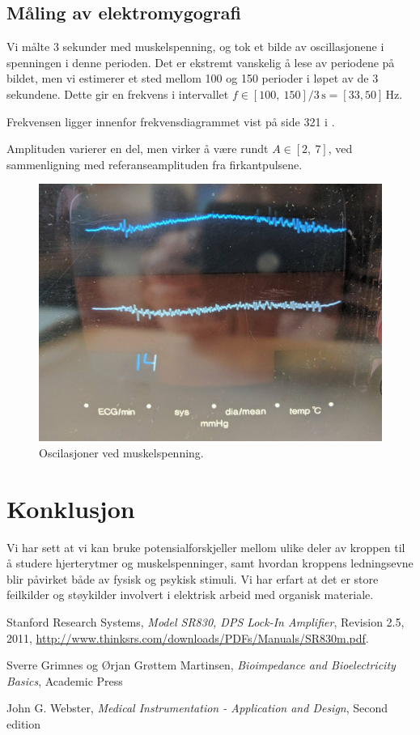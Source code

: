 \documentclass[11pt,norsk]{article}
\begin{document}
\subsection{Måling av elektromygografi}
Vi målte 3 sekunder med muskelspenning, og tok et bilde av oscillasjonene i spenningen i denne perioden. Det er ekstremt vanskelig å lese av periodene på bildet, men vi estimerer et sted mellom 100 og 150 perioder i løpet av de 3 sekundene. Dette gir en frekvens i intervallet $f \in [100,\ 150] / 3\,\mathrm{s} = [33, 50]\,\mathrm{Hz}$.

Frekvensen ligger innenfor frekvensdiagrammet vist på side 321 i \cite{MedIns}.

Amplituden varierer en del, men virker å være rundt $A \in [2,\ 7]$, ved sammenligning med referanseamplituden fra firkantpulsene.


\begin{figure}[H]
\includegraphics[width = \textwidth]{fig/picture4.jpg}
\caption{Oscilasjoner ved muskelspenning.}
\label{fig:picture4}
\end{figure}

\section{Konklusjon}
Vi har sett at vi kan bruke potensialforskjeller mellom ulike deler av kroppen til å studere hjerterytmer og muskelspenninger, samt hvordan kroppens ledningsevne blir påvirket både av fysisk og psykisk stimuli. Vi har erfart at det er store feilkilder og støykilder involvert i elektrisk arbeid med organisk materiale.



\begin{thebibliography}{9}

    Stanford Research Systems,
    \emph{Model SR830, DPS Lock-In Amplifier},
    Revision 2.5,
    2011,
    \url{http://www.thinksrs.com/downloads/PDFs/Manuals/SR830m.pdf}.

    Sverre Grimnes og Ørjan Grøttem Martinsen,
    \emph{Bioimpedance and Bioelectricity Basics},
    Academic Press

    John G. Webster,
    \emph{Medical Instrumentation - Application and Design},
    Second edition

\end{thebibliography}
\end{document}
